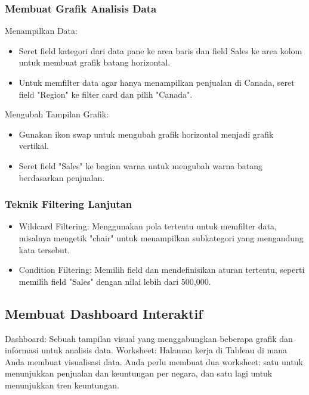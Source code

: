 \documentclass{article}
\begin{document}
\subsubsection{Membuat Grafik Analisis Data}
Menampilkan Data:
\begin{itemize}
    \item Seret field kategori dari data pane ke area baris dan field Sales ke area kolom untuk membuat grafik batang horizontal.
    \item Untuk memfilter data agar hanya menampilkan penjualan di Canada, seret field "Region" ke filter card dan pilih "Canada".
\end{itemize}
Mengubah Tampilan Grafik:
\begin{itemize}
    \item Gunakan ikon swap untuk mengubah grafik horizontal menjadi grafik vertikal.
    \item Seret field "Sales" ke bagian warna untuk mengubah warna batang berdasarkan penjualan.
\end{itemize}

\subsubsection{Teknik Filtering Lanjutan}
\begin{itemize}
    \item Wildcard Filtering: Menggunakan pola tertentu untuk memfilter data, misalnya mengetik "chair" untuk menampilkan subkategori yang mengandung kata tersebut.
    \item Condition Filtering: Memilih field dan mendefinisikan aturan tertentu, seperti memilih field "Sales" dengan nilai lebih dari 500,000.
\end{itemize}

\subsection{Membuat Dashboard Interaktif}
Dashboard: Sebuah tampilan visual yang menggabungkan beberapa grafik dan informasi untuk analisis data.
Worksheet: Halaman kerja di Tableau di mana Anda membuat visualisasi data. Anda perlu membuat dua worksheet: satu untuk menunjukkan penjualan dan keuntungan per negara, dan satu lagi untuk menunjukkan tren keuntungan.
\end{document}
